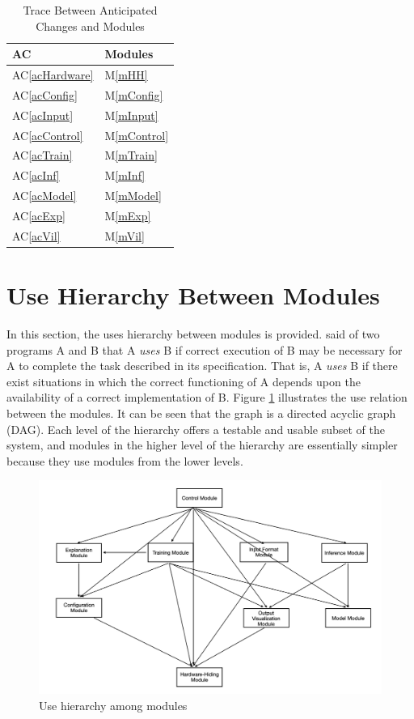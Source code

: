 \documentclass[12pt, titlepage]{article}
\newcommand{\acref}[1]{AC\ref{#1}}
\newcommand{\mref}[1]{M\ref{#1}}
\begin{document}
\begin{table}[H]
\centering
\begin{tabular}{p{} p{}}
\toprule
\textbf{AC} & \textbf{Modules}\\
\midrule
\acref{acHardware} & \mref{mHH}\\
\acref{acConfig} & \mref{mConfig}\\
\acref{acInput} & \mref{mInput}\\
\acref{acControl} & \mref{mControl}\\
\acref{acTrain} & \mref{mTrain}\\
\acref{acInf} & \mref{mInf}\\
\acref{acModel} & \mref{mModel}\\
\acref{acExp} & \mref{mExp}\\
\acref{acVil} & \mref{mVil}\\
\bottomrule
\end{tabular}
\caption{Trace Between Anticipated Changes and Modules}
\label{TblACT}
\end{table}

\section{Use Hierarchy Between Modules} \label{SecUse}

In this section, the uses hierarchy between modules is
provided. \citet{Parnas1978} said of two programs A and B that A {\em uses} B if
correct execution of B may be necessary for A to complete the task described in
its specification. That is, A {\em uses} B if there exist situations in which
the correct functioning of A depends upon the availability of a correct
implementation of B.  Figure \ref{FigUH} illustrates the use relation between
the modules. It can be seen that the graph is a directed acyclic graph
(DAG). Each level of the hierarchy offers a testable and usable subset of the
system, and modules in the higher level of the hierarchy are essentially simpler
because they use modules from the lower levels.


\begin{figure}[H]
\centering
\includegraphics[width=1\textwidth]{UsesHierarchy.png}
\caption{Use hierarchy among modules}
\label{FigUH}
\end{figure}
\end{document}

